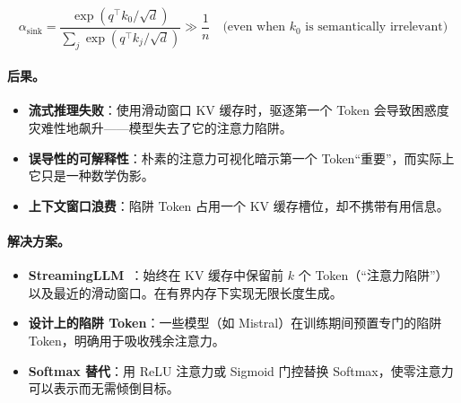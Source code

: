 \[
\alpha_{\text{sink}} = \frac{\exp(q^\top k_0 / \sqrt{d})}{\sum_{j} \exp(q^\top k_j / \sqrt{d})} \gg \frac{1}{n} \quad \text{(even when } k_0 \text{ is semantically irrelevant)}
\]

\paragraph{后果。}
\label{consequences.}

\begin{itemize}
  \item \textbf{流式推理失败}：使用滑动窗口 KV 缓存时，驱逐第一个 Token 会导致困惑度灾难性地飙升——模型失去了它的注意力陷阱。
  \item \textbf{误导性的可解释性}：朴素的注意力可视化暗示第一个 Token``重要''，而实际上它只是一种数学伪影。
  \item \textbf{上下文窗口浪费}：陷阱 Token 占用一个 KV 缓存槽位，却不携带有用信息。
\end{itemize}

\paragraph{解决方案。}
\label{solutions.}

\begin{itemize}
  \item \textbf{StreamingLLM}~\cite{xiao2024efficient}：始终在 KV 缓存中保留前 $k$ 个 Token（``注意力陷阱''）以及最近的滑动窗口。在有界内存下实现无限长度生成。
  \item \textbf{设计上的陷阱 Token}：一些模型（如 Mistral）在训练期间预置专门的陷阱 Token，明确用于吸收残余注意力。
  \item \textbf{Softmax 替代}：用 ReLU 注意力或 Sigmoid 门控替换 Softmax，使零注意力可以表示而无需倾倒目标。
\end{itemize}

